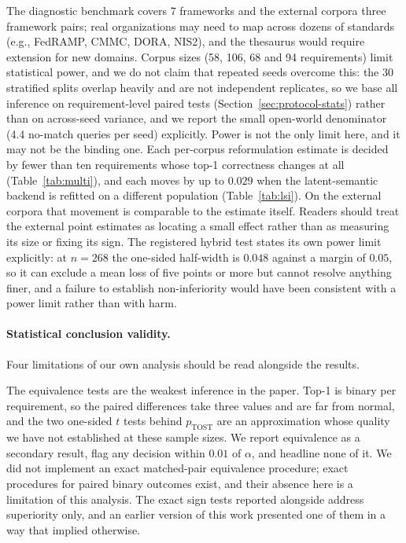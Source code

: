 \documentclass[a4paper,fleqn]{cas-sc}
\begin{document}
The diagnostic benchmark covers 7 frameworks and the external corpora three framework pairs; real organizations may need to map across dozens of standards (e.g., FedRAMP, CMMC, DORA, NIS2), and the thesaurus would require extension for new domains.
Corpus sizes (58, 106, 68 and 94 requirements) limit statistical power, and we do not claim that repeated seeds overcome this: the 30 stratified splits overlap heavily and are not independent replicates, so we base all inference on requirement-level paired tests (Section~\ref{sec:protocol-stats}) rather than on across-seed variance, and we report the small open-world denominator (4.4 no-match queries per seed) explicitly.
Power is not the only limit here, and it may not be the binding one. Each per-corpus reformulation estimate is decided by fewer than ten requirements whose top-1 correctness changes at all (Table~\ref{tab:multi}), and each moves by up to $0.029$ when the latent-semantic backend is refitted on a different population (Table~\ref{tab:lsi}). On the external corpora that movement is comparable to the estimate itself. Readers should treat the external point estimates as locating a small effect rather than as measuring its size or fixing its sign.
The registered hybrid test states its own power limit explicitly: at $n = 268$ the one-sided half-width is $0.048$ against a margin of $0.05$, so it can exclude a mean loss of five points or more but cannot resolve anything finer, and a failure to establish non-inferiority would have been consistent with a power limit rather than with harm.

\paragraph{Statistical conclusion validity.}
Four limitations of our own analysis should be read alongside the results.

The equivalence tests are the weakest inference in the paper. Top-1 is binary per requirement, so the paired differences take three values and are far from normal, and the two one-sided $t$ tests behind $p_{\text{TOST}}$ are an approximation whose quality we have not established at these sample sizes. We report equivalence as a secondary result, flag any decision within $0.01$ of $\alpha$, and headline none of it. We did not implement an exact matched-pair equivalence procedure; exact procedures for paired binary outcomes exist, and their absence here is a limitation of this analysis. The exact sign tests reported alongside address superiority only, and an earlier version of this work presented one of them in a way that implied otherwise.
\end{document}

